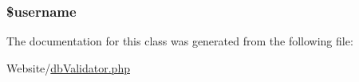 \hypertarget{classdb_validator_a0eb82aa5f81cf845de4b36cd653c42cf}{
\subsubsection[{\$username}]{\setlength{\rightskip}{0pt plus 5cm}\${\bf username}}}\label{classdb_validator_a0eb82aa5f81cf845de4b36cd653c42cf}


The documentation for this class was generated from the following file\-:\begin{DoxyCompactItemize}
\item 
Website/\hyperlink{db_validator_8php}{db\-Validator.\-php}\end{DoxyCompactItemize}
